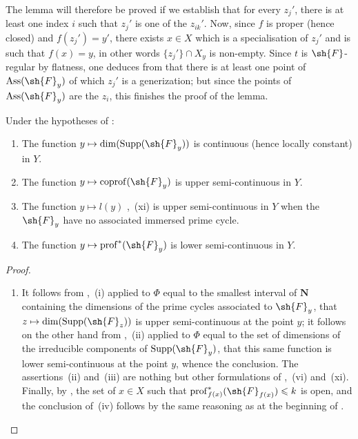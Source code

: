 \begin{env}[12.2.1.3]
The lemma will therefore be proved if we establish that for every $z_j'$, there is at least one index $i$ such that $z_j'$ is one of the $z_{ik}'$.
Now, since $f$ is proper (hence closed) and $f(z_j')=y'$, there exists $x\in X$ which is a specialisation of $z_j'$ and is such that $f(x)=y$, in other words $\{z_j'\}\cap X_y$ is non-empty.
Since $t$ is $\sh{F}$-regular by flatness, one deduces from  that there is at least one point of $\operatorname{Ass}(\sh{F}_y)$ of which $z_j'$ is a generization; but since the points of $\operatorname{Ass}(\sh{F}_y)$ are the $z_i$, this finishes the proof of the lemma.
\end{env}

\begin{corollary}[12.2.2]
\label{IV.12.2.2}
Under the hypotheses of :
\begin{enumerate}[label=(\roman*)]
  \item The function $y\mapsto\dim(\operatorname{Supp}(\sh{F}_y))$ is continuous (hence locally constant) in $Y$.
  \item The function $y\mapsto\operatorname{coprof}(\sh{F}_y)$  is upper semi-continuous in $Y$.
  \item The function $y\mapsto l(y)$ ,~(xi) is upper semi-continuous in $Y$ when the $\sh{F}_y$ have no associated immersed prime cycle.
  \item The function $y\mapsto\operatorname{prof}^*(\sh{F}_y)$  is lower semi-continuous in $Y$.
\end{enumerate}
\end{corollary}

\begin{proof}
\begin{enumerate}[label=(\roman*)]
  \item It follows from ,~(i) applied to $\Phi$ equal to the smallest interval of $\mathbf{N}$ containing the dimensions of the prime cycles associated to $\sh{F}_y$, that $z\mapsto\dim(\operatorname{Supp}(\sh{F}_z))$ is upper semi-continuous at the point $y$; it follows on the other hand from ,~(ii) applied to $\Phi$ equal to the set of dimensions of the irreducible components of $\operatorname{Supp}(\sh{F}_y)$, that this same function is lower semi-continuous at the point $y$, whence the conclusion.
The assertions~(ii) and~(iii) are nothing but other formulations of ,~(vi) and~(xi).
Finally, by , the set of $x\in X$ such that $\operatorname{prof}_{f(x)}^*(\sh{F}_{f(x)})\leqslant k$ is open, and the conclusion of~(iv) follows by the same reasoning as at the beginning of .
\end{enumerate}
\end{proof}


